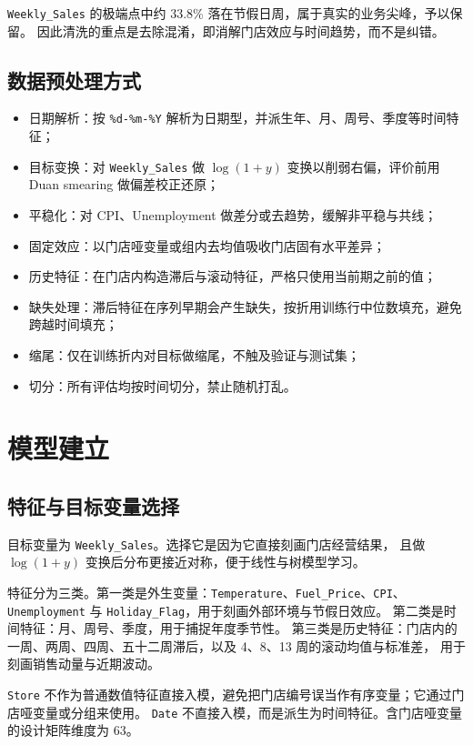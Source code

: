 \documentclass[UTF8,a4paper,11pt]{ctexart}
\begin{document}
\noindent
\texttt{Weekly\_Sales} 的极端点中约 33.8\% 落在节假日周，属于真实的业务尖峰，予以保留。
因此清洗的重点是去除混淆，即消解门店效应与时间趋势，而不是纠错。

\subsection{数据预处理方式}

\begin{itemize}[leftmargin=1.6em]
  \item 日期解析：按 \texttt{\%d-\%m-\%Y} 解析为日期型，并派生年、月、周号、季度等时间特征；
  \item 目标变换：对 \texttt{Weekly\_Sales} 做 $\log(1+y)$ 变换以削弱右偏，评价前用 Duan smearing 做偏差校正还原；
  \item 平稳化：对 CPI、Unemployment 做差分或去趋势，缓解非平稳与共线；
  \item 固定效应：以门店哑变量或组内去均值吸收门店固有水平差异；
  \item 历史特征：在门店内构造滞后与滚动特征，严格只使用当前期之前的值；
  \item 缺失处理：滞后特征在序列早期会产生缺失，按折用训练行中位数填充，避免跨越时间填充；
  \item 缩尾：仅在训练折内对目标做缩尾，不触及验证与测试集；
  \item 切分：所有评估均按时间切分，禁止随机打乱。
\end{itemize}

\section{模型建立}

\subsection{特征与目标变量选择}

目标变量为 \texttt{Weekly\_Sales}。选择它是因为它直接刻画门店经营结果，
且做 $\log(1+y)$ 变换后分布更接近对称，便于线性与树模型学习。

特征分为三类。第一类是外生变量：\texttt{Temperature}、\texttt{Fuel\_Price}、\texttt{CPI}、
\texttt{Unemployment} 与 \texttt{Holiday\_Flag}，用于刻画外部环境与节假日效应。
第二类是时间特征：月、周号、季度，用于捕捉年度季节性。
第三类是历史特征：门店内的一周、两周、四周、五十二周滞后，以及 4、8、13 周的滚动均值与标准差，
用于刻画销售动量与近期波动。

\texttt{Store} 不作为普通数值特征直接入模，避免把门店编号误当作有序变量；它通过门店哑变量或分组来使用。
\texttt{Date} 不直接入模，而是派生为时间特征。含门店哑变量的设计矩阵维度为 63。
\end{document}
